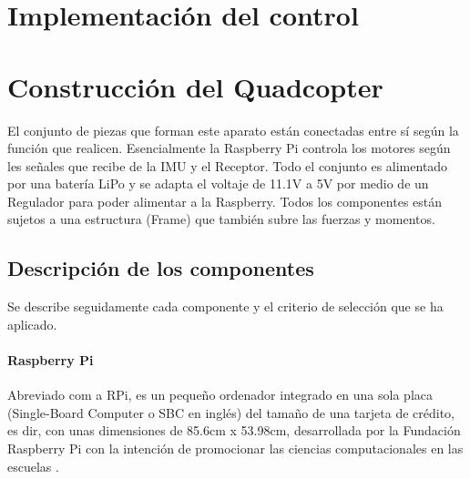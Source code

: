 \documentclass[twoside,11pt]{report}
\begin{document}
\newpage
\chapter{Implementación del control} \label{implement}

\newpage
\chapter{Construcción del Quadcopter} \label{construc}
El conjunto de piezas que forman este aparato están conectadas entre sí según la función que realicen. Esencialmente la Raspberry Pi controla los motores según les señales que recibe de la IMU y el Receptor. Todo el conjunto es alimentado por una batería LiPo y se adapta el voltaje de 11.1V a 5V por medio de un Regulador para poder alimentar a la Raspberry. Todos los componentes están sujetos a una estructura (Frame) que también subre las fuerzas y momentos.  

\section{Descripción de los componentes}
Se describe seguidamente cada componente y el criterio de selección que se ha aplicado.
\subsubsection*{Raspberry Pi} 
Abreviado com a RPi, es un pequeño ordenador integrado en una sola placa (Single-Board Computer o SBC en inglés) del tamaño de una tarjeta de crédito, es dir, con unas dimensiones de 85.6cm x 53.98cm, desarrollada por la Fundación Raspberry Pi con la intención de promocionar las ciencias computacionales en las escuelas \cite{RPiWiki}. 
\end{document}
